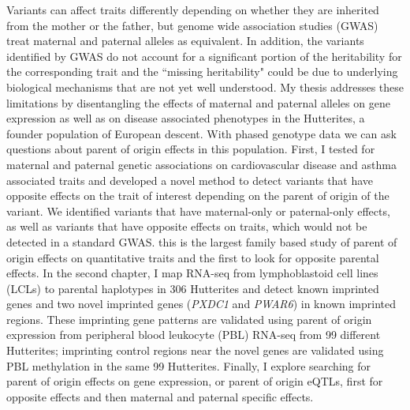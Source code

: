 \abstract

Variants can affect traits differently depending on whether they are inherited from the mother or the father, but genome wide association studies (GWAS) treat maternal and paternal alleles as equivalent. In addition, the variants identified by GWAS do not account for a significant portion of the heritability for the corresponding trait and the ``missing heritability" could be due to underlying biological mechanisms that are not yet well understood. My thesis addresses these limitations by disentangling the effects of maternal and paternal alleles on gene expression as well as on disease associated phenotypes in the Hutterites, a founder population of European descent. With phased genotype data we can ask questions about parent of origin effects in this population. First, I tested for maternal and paternal genetic associations on cardiovascular disease and asthma associated traits and developed a novel method to detect variants that have opposite effects on the trait of interest depending on the parent of origin of the variant. We identified variants that have maternal-only or paternal-only effects, as well as variants that have opposite effects on traits, which would not be detected in a standard GWAS. this is the largest family based study of parent of origin effects on quantitative traits and the first to look for opposite parental effects. In the second chapter, I map RNA-seq from lymphoblastoid cell lines (LCLs) to parental haplotypes in 306  Hutterites and detect known imprinted genes and two novel imprinted genes (\emph{PXDC1} and \emph{PWAR6}) in known imprinted regions. These imprinting gene patterns are validated using parent of origin expression from peripheral blood leukocyte (PBL) RNA-seq from 99 different Hutterites; imprinting control regions near the novel genes are validated using PBL methylation in the same 99 Hutterites. Finally, I explore searching for parent of origin effects on gene expression, or parent of origin eQTLs, first for opposite effects and then maternal and paternal specific effects. 
